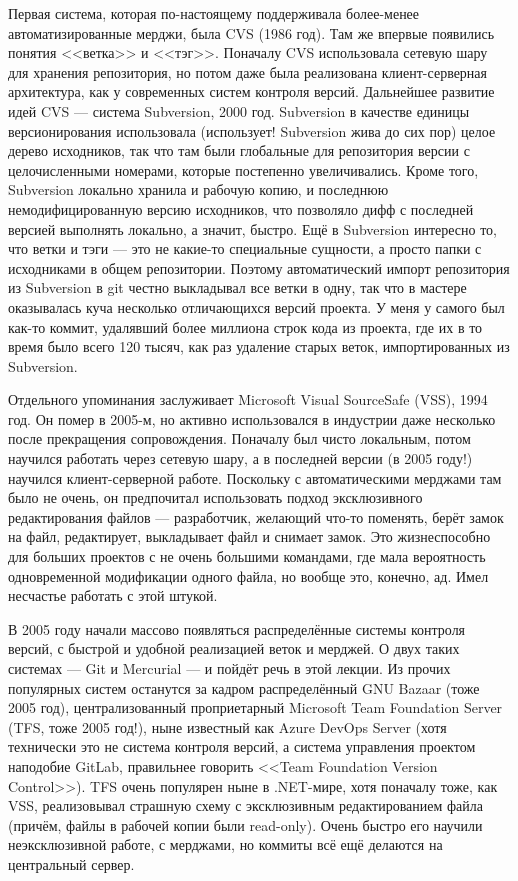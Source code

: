 \documentclass{../../text-style}
\begin{document}
Первая система, которая по-настоящему поддерживала более-менее автоматизированные мерджи, была CVS (1986 год). Там же впервые появились понятия <<ветка>> и <<тэг>>. Поначалу CVS использовала сетевую шару для хранения репозитория, но потом даже была реализована клиент-серверная архитектура, как у современных систем контроля версий. Дальнейшее развитие идей CVS --- система Subversion, 2000 год. Subversion в качестве единицы версионирования использовала (использует! Subversion жива до сих пор) целое дерево исходников, так что там были глобальные для репозитория версии с целочисленными номерами, которые постепенно увеличивались. Кроме того, Subversion локально хранила и рабочую копию, и последнюю немодифицированную версию исходников, что позволяло дифф с последней версией выполнять локально, а значит, быстро. Ещё в Subversion интересно то, что ветки и тэги --- это не какие-то специальные сущности, а просто папки с исходниками в общем репозитории. Поэтому автоматический импорт репозитория из Subversion в git честно выкладывал все ветки в одну, так что в мастере оказывалась куча несколько отличающихся версий проекта. У меня у самого был как-то коммит, удалявший более миллиона строк кода из проекта, где их в то время было всего 120 тысяч, как раз удаление старых веток, импортированных из Subversion.

Отдельного упоминания заслуживает Microsoft Visual SourceSafe (VSS), 1994 год. Он помер в 2005-м, но активно использовался в индустрии даже несколько после прекращения сопровождения. Поначалу был чисто локальным, потом научился работать через сетевую шару, а в последней версии (в 2005 году!) научился клиент-серверной работе. Поскольку с автоматическими мерджами там было не очень, он предпочитал использовать подход эксклюзивного редактирования файлов --- разработчик, желающий что-то поменять, берёт замок на файл, редактирует, выкладывает файл и снимает замок. Это жизнеспособно для больших проектов с не очень большими командами, где мала вероятность одновременной модификации одного файла, но вообще это, конечно, ад. Имел несчастье работать с этой штукой.

В 2005 году начали массово появляться распределённые системы контроля версий, с быстрой и удобной реализацией веток и мерджей. О двух таких системах --- Git и Mercurial --- и пойдёт речь в этой лекции. Из прочих популярных систем останутся за кадром распределённый GNU Bazaar (тоже 2005 год), централизованный проприетарный Microsoft Team Foundation Server (TFS, тоже 2005 год!), ныне известный как Azure DevOps Server (хотя технически это не система контроля версий, а система управления проектом наподобие GitLab, правильнее говорить <<Team Foundation Version Control>>). TFS очень популярен ныне в .NET-мире, хотя поначалу тоже, как VSS, реализовывал страшную схему с эксклюзивным редактированием файла (причём, файлы в рабочей копии были read-only). Очень быстро его научили неэксклюзивной работе, с мерджами, но коммиты всё ещё делаются на центральный сервер.
\end{document}
